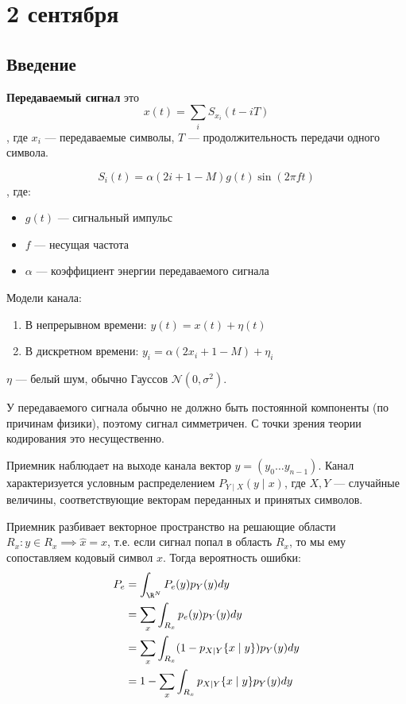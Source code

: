\chapter{2 сентября}

\section{Введение}

\begin{definition}
    \textbf{Передаваемый сигнал} это
    \[x(t) = \sum_i S_{x_i} (t - iT)\]
    , где \(x_i\) --- передаваемые символы, \(T\) --- продолжительность передачи одного символа.
\end{definition}

\begin{example}
    \[S_i(t) = \alpha(2i + 1 - M)g(t) \sin(2 \pi ft)\]
    , где:
    \begin{itemize}
        \item \(g(t)\) --- сигнальный импульс
        \item \(f\) --- несущая частота
        \item \(\alpha\) --- коэффициент энергии передаваемого сигнала
    \end{itemize}
\end{example}

Модели канала:
\begin{enumerate}
    \item В непрерывном времени: \(y(t) = x(t) + \eta(t)\)
    \item В дискретном времени: \(y_i = \alpha(2 x_i + 1 - M) + \eta_i\)
\end{enumerate}

\(\eta\) --- белый шум, обычно Гауссов \(\mathcal{N}(0, \sigma^2)\).

У передаваемого сигнала обычно не должно быть постоянной компоненты (по причинам физики), поэтому сигнал симметричен.
С точки зрения теории кодирования это несущественно.

Приемник наблюдает на выходе канала вектор \(y = (y_0 \ldots y_{n-1})\).
Канал характеризуется условным распределением \(P_{Y \mid X}(y \mid x)\),
где \(X, Y\) --- случайные величины, соответствующие векторам переданных и принятых символов.

Приемник разбивает векторное пространство на решающие области \(R_x : y \in R_x \implies \hat{x} = x\), т.е. если сигнал попал в область \(R_x\), то мы ему сопоставляем кодовый символ \(x\).
Тогда вероятность ошибки:
\begin{align}
    P_e & = \int_{\R^N} P_e(y) p_Y(y) dy                               \\
        & = \sum_x \int_{R_x} p_e(y) p_Y(y) dy                         \\
        & = \sum_x \int_{R_x} (1 - p_{X \mid Y}\{x \mid y\}) p_Y(y) dy \\
        & = 1 - \sum_x \int_{R_x} p_{X \mid Y} \{x \mid y\} p_Y(y) dy
\end{align}


